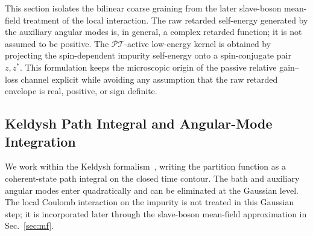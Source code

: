 \documentclass[%
  aps,prb,reprint,amsmath,amssymb,superscriptaddress,longbibliography,floatfix
]{revtex4-2}
\newcommand{\PT}{\mathcal{PT}}
\begin{document}
This section isolates the bilinear coarse graining from the later
slave-boson mean-field treatment of the local interaction.  The raw
retarded self-energy generated by the auxiliary angular modes is, in
general, a complex retarded function; it is not assumed to be positive.
The $\PT$-active low-energy kernel is obtained by projecting the
spin-dependent impurity self-energy onto a spin-conjugate pair
$z,z^*$.  This formulation keeps the microscopic origin of the passive
relative gain--loss channel explicit while avoiding any assumption that the raw
retarded envelope is real, positive, or sign definite.


\subsection{Keldysh Path Integral and Angular-Mode Integration}

We work within the Keldysh formalism~\cite{kamenev2023field}, writing
the partition function as a coherent-state path integral on the closed
time contour.  The bath and auxiliary angular modes enter quadratically
and can be eliminated at the Gaussian level.  The local Coulomb
interaction on the impurity is not treated in this Gaussian step; it is
incorporated later through the slave-boson mean-field approximation in
Sec.~\ref{sec:mf}.
\end{document}
